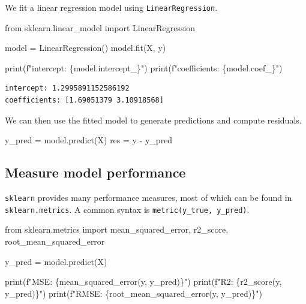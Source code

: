\documentclass[
  letterpaper,
  DIV=11,
  numbers=noendperiod]{scrreprt}
\newenvironment{Shaded}{\begin{snugshade}}{\end{snugshade}}
\newcommand{\BuiltInTok}[1]{\textcolor[rgb]{0.00,0.23,0.31}{#1}}
\newcommand{\ImportTok}[1]{\textcolor[rgb]{0.00,0.46,0.62}{#1}}
\newcommand{\NormalTok}[1]{\textcolor[rgb]{0.00,0.23,0.31}{#1}}
\newcommand{\OperatorTok}[1]{\textcolor[rgb]{0.37,0.37,0.37}{#1}}
\newcommand{\SpecialCharTok}[1]{\textcolor[rgb]{0.37,0.37,0.37}{#1}}
\newcommand{\SpecialStringTok}[1]{\textcolor[rgb]{0.13,0.47,0.30}{#1}}
\theoremstyle{definition}
\theoremstyle{definition}
\theoremstyle{plain}
\theoremstyle{plain}
\theoremstyle{remark}
\begin{document}
We fit a linear regression model using \texttt{LinearRegression}.

\begin{Shaded}
\begin{Highlighting}[]
\ImportTok{from}\NormalTok{ sklearn.linear\_model }\ImportTok{import}\NormalTok{ LinearRegression}

\NormalTok{model }\OperatorTok{=}\NormalTok{ LinearRegression()}
\NormalTok{model.fit(X, y)}

\BuiltInTok{print}\NormalTok{(}\SpecialStringTok{f"intercept: }\SpecialCharTok{\{}\NormalTok{model}\SpecialCharTok{.}\NormalTok{intercept\_}\SpecialCharTok{\}}\SpecialStringTok{"}\NormalTok{)}
\BuiltInTok{print}\NormalTok{(}\SpecialStringTok{f"coefficients: }\SpecialCharTok{\{}\NormalTok{model}\SpecialCharTok{.}\NormalTok{coef\_}\SpecialCharTok{\}}\SpecialStringTok{"}\NormalTok{)}
\end{Highlighting}
\end{Shaded}

\begin{verbatim}
intercept: 1.2995891152586192
coefficients: [1.69051379 3.10918568]
\end{verbatim}

We can then use the fitted model to generate predictions and compute
residuals.

\begin{Shaded}
\begin{Highlighting}[]
\NormalTok{y\_pred }\OperatorTok{=}\NormalTok{ model.predict(X)}
\NormalTok{res }\OperatorTok{=}\NormalTok{ y }\OperatorTok{{-}}\NormalTok{ y\_pred}
\end{Highlighting}
\end{Shaded}

\subsection{Measure model performance}\label{measure-model-performance}

\texttt{sklearn} provides many performance measures, most of which can
be found in \texttt{sklearn.metrics}. A common syntax is
\texttt{metric(y\_true,\ y\_pred)}.

\begin{Shaded}
\begin{Highlighting}[]
\ImportTok{from}\NormalTok{ sklearn.metrics }\ImportTok{import}\NormalTok{ mean\_squared\_error, r2\_score, root\_mean\_squared\_error}

\NormalTok{y\_pred }\OperatorTok{=}\NormalTok{ model.predict(X)}

\BuiltInTok{print}\NormalTok{(}\SpecialStringTok{f"MSE: }\SpecialCharTok{\{}\NormalTok{mean\_squared\_error(y, y\_pred)}\SpecialCharTok{\}}\SpecialStringTok{"}\NormalTok{)}
\BuiltInTok{print}\NormalTok{(}\SpecialStringTok{f"R2: }\SpecialCharTok{\{}\NormalTok{r2\_score(y, y\_pred)}\SpecialCharTok{\}}\SpecialStringTok{"}\NormalTok{)}
\BuiltInTok{print}\NormalTok{(}\SpecialStringTok{f"RMSE: }\SpecialCharTok{\{}\NormalTok{root\_mean\_squared\_error(y, y\_pred)}\SpecialCharTok{\}}\SpecialStringTok{"}\NormalTok{)}
\end{Highlighting}
\end{Shaded}
\end{document}
